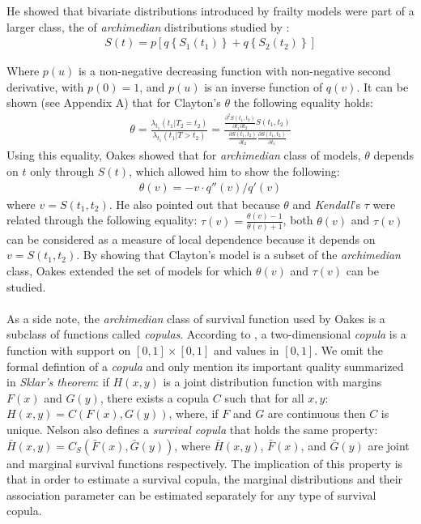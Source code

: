 \documentclass[]{article}
\begin{document}
He showed that bivariate distributions introduced by frailty models were part of a larger class, the of \emph{archimedian} distributions studied by \cite{genest1986copules}:
$$
\begin{aligned}
	S(t) = p\left[ q\left\{ S_1(t_1) \right\}  + q\left\{ S_2(t_2) \right\}  \right]
\end{aligned}
$$

Where $p(u)$ is a non-negative decreasing function with non-negative second derivative, with $p(0)=1$, and $p(u)$ is an inverse function of $q(v)$. It can be shown (see Appendix A) that for Clayton's $\theta$ the following equality holds:
	$$
	\begin{aligned}
		\theta = \frac{\lambda_{t_1}(t_1|T_2=t_2)}{\lambda_{t_1}(t_1|T>t_2)} = \frac{ \frac{\partial^2 S(t_1,t_2)}{\partial t_1 \partial t_2} S(t_1, t_2)}    {\frac{\partial S(t_1, t_2)}{\partial t_2} \frac{\partial S(t_1, t_2)}{\partial t_1}}
	\end{aligned}
	$$
Using this equality, Oakes showed that for \emph{archimedian} class of models, $\theta$ depends on $t$ only through $S(t)$, which allowed him to show the following:
$$
\begin{aligned}
\theta(v) = -v\cdot q''(v)/q'(v)
\end{aligned}
$$
where $v=S(t_1, t_2)$. He also pointed out that because $\theta$ and \emph{Kendall}'s $\tau$ were related through the following equality: $\tau(v) = \frac{\theta(v)-1}{\theta(v)+1}$, both $\theta(v)$ and $\tau(v)$ can be considered as a measure of local dependence because it depends on $v=S(t_1, t_2)$. By showing that Clayton's model is a subset of the \emph{archimedian} class, Oakes extended the set of models for which $\theta(v)$ and $\tau(v)$ can be studied.\\
~\\
As a side note, the \emph{archimedian} class of survival function used by Oakes is a subclass of functions called \emph{copulas}. According to \cite{nelsen2007introduction}, a two-dimensional \emph{copula} is a function with support on $[0, 1] \times [0, 1]$ and values in $[0, 1]$. We omit the formal defintion of a \emph{copula} and only mention its important quality summarized in \emph{Sklar's theorem}: if $H(x,y)$ is a joint distribution function with margins $F(x)$ and $G(y)$, there exists a copula $C$ such that for all $x,y$: $H(x,y) = C(F(x), G(y))$, where, if $F$ and $G$ are continuous then $C$ is unique. Nelson also defines a \emph{survival copula} that holds the same property: $\bar{H}(x,y) = C_S(\bar{F}(x), \bar{G}(y))$, where $\bar{H}(x,y)$, $\bar{F}(x)$, and $\bar{G}(y)$ are joint and marginal survival functions respectively. The implication of this property is that in order to estimate a survival copula, the marginal distributions and their association parameter can be estimated separately for any type of survival copula. 
\end{document}
